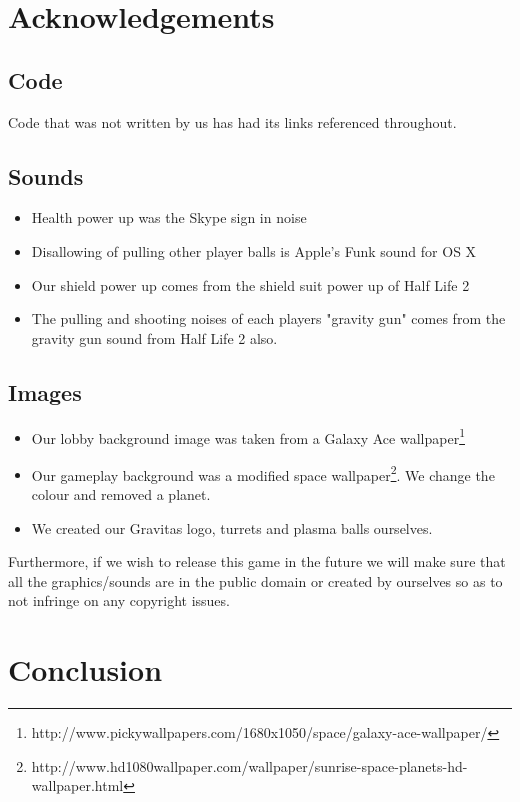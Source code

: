 \documentclass[a4wide, 11pt]{article}
\begin{document}
\section{Acknowledgements}
\subsection{Code}
Code that was not written by us has had its links referenced throughout.

\subsection{Sounds}
\begin{itemize}
    \item Health power up was the Skype sign in noise
    \item Disallowing of pulling other player balls is Apple's Funk sound for OS X
    \item Our shield power up comes from the shield suit power up of Half Life 2
    \item The pulling and shooting noises of each players "gravity gun" comes from the gravity gun sound from Half Life 2 also.
\end{itemize}

\subsection{Images}
\begin{itemize}
    \item Our lobby background image was taken from a Galaxy Ace wallpaper\footnote{http://www.pickywallpapers.com/1680x1050/space/galaxy-ace-wallpaper/}
    \item Our gameplay background was a modified space wallpaper\footnote{
http://www.hd1080wallpaper.com/wallpaper/sunrise-space-planets-hd-wallpaper.html}. We change the colour and removed a planet.
    \item We created our Gravitas logo, turrets and plasma balls ourselves.
\end{itemize}

Furthermore, if we wish to release this game in the future we will make sure that all the graphics/sounds are in the public domain or created by ourselves so as to not infringe on any copyright issues. 

\section{Conclusion}
\end{document}
